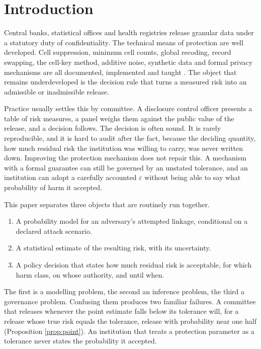 \documentclass[11pt,a4paper]{article}
\theoremstyle{plain}
\theoremstyle{definition}
\theoremstyle{definition}
\theoremstyle{plain}
\begin{document}
\clearpage

{\setcounter{tocdepth}{2}\tableofcontents}

\clearpage

\section{Introduction}\label{sec:intro}

Central banks, statistical offices and health registries release granular data
under a statutory duty of confidentiality. The technical means of protection
are well developed. Cell suppression, minimum cell counts, global recoding,
record swapping, the cell-key method, additive noise, synthetic data and formal
privacy mechanisms are all documented, implemented and taught
\citep{willenborg1996,willenborg2001,duncanelliot2011,hundepool2012,templ2015,dwork2014}. The object that
remains underdeveloped is the decision rule that turns a measured risk into an
admissible or inadmissible release.

Practice usually settles this by committee. A disclosure control officer
presents a table of risk measures, a panel weighs them against the public value
of the release, and a decision follows. The decision is often sound. It is
rarely reproducible, and it is hard to audit after the fact, because the
deciding quantity, how much residual risk the institution was
willing to carry, was never written down. Improving the protection mechanism
does not repair this. A mechanism with a formal guarantee can still be governed
by an unstated tolerance, and an institution can adopt a carefully accounted $\varepsilon$ without being
able to say what probability of harm it accepted.

This paper separates three objects that are routinely run together.

\begin{enumerate}
\item A probability model for an adversary's attempted linkage, conditional on
a declared attack scenario.
\item A statistical estimate of the resulting risk, with its uncertainty.
\item A policy decision that states how much residual risk is acceptable, for
which harm class, on whose authority, and until when.
\end{enumerate}

The first is a modelling problem, the second an inference problem, the third a
governance problem. Confusing them produces two familiar failures. A committee
that releases whenever the point estimate falls below its tolerance will, for a
release whose true risk equals the tolerance, release with probability near one
half (Proposition \ref{prop:point}). An institution that treats a protection
parameter as a tolerance never states the probability it accepted.
\end{document}
